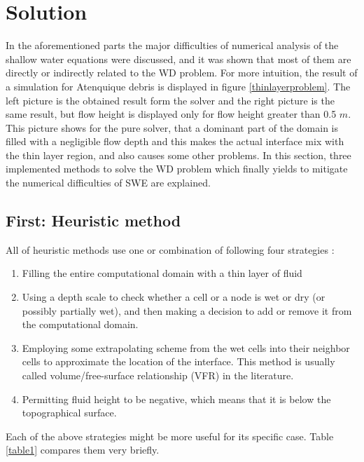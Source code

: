 \documentclass[letterpaper,10pt]{article}
\begin{document}
 

\section{Solution}\label{solution}
In the aforementioned parts the major difficulties of numerical analysis of the shallow water
equations were discussed, and it was shown that most of them are directly or indirectly related to the WD problem.
For more intuition, the result of a simulation for Atenquique debris is displayed in figure \ref{thinlayerproblem}. 
The left picture is the obtained result form the solver and the right picture is the same result, but flow height is displayed 
only for flow height greater than 0.5 $m$. This picture shows for the pure solver, that a dominant part of the 
domain is filled with a negligible flow depth and this makes the actual interface mix with the thin layer region, and 
also causes some other problems. In this section, three implemented methods to solve the WD problem which finally yields to 
mitigate the numerical difficulties of SWE are explained. 


\subsection{First: Heuristic method} \label{Heuristic}
All of heuristic methods use one or combination of following four strategies \cite{Medeiros2013}: 
\begin{enumerate}
 
 \item Filling the entire computational domain with a thin layer of fluid
 \item Using a depth scale to check whether a cell or a node is wet or dry 
 (or possibly partially wet), and then  making a decision to add or remove it 
 from the computational domain.
 \item Employing some extrapolating scheme from the wet cells into their neighbor 
 cells to approximate the location of the interface. This method is usually called 
 volume/free-surface relationship (VFR) in the literature.
 \item Permitting fluid height to be negative, which means that it is below the topographical surface.
\end{enumerate}
Each of the above strategies might be more useful for its specific case. Table \ref{table1} compares them very briefly.
\end{document}
